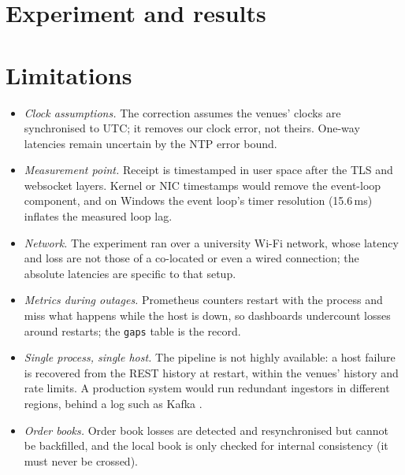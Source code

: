 \documentclass[11pt,a4paper]{article}
\newcommand{\code}[1]{\texttt{#1}}
\newcommand{\ms}{\,ms}
\begin{document}
\section{Experiment and results}\label{sec:results}



\section{Limitations}\label{sec:limitations}

\begin{itemize}[nosep]
  \item \emph{Clock assumptions.} The correction assumes the venues' clocks are synchronised to UTC; it removes
        our clock error, not theirs. One-way latencies remain uncertain by the NTP error bound.
  \item \emph{Measurement point.} Receipt is timestamped in user space after the TLS and websocket layers.
        Kernel or NIC timestamps would remove the event-loop component, and on Windows the event loop's timer
        resolution (15.6\ms) inflates the measured loop lag.
  \item \emph{Network.} The experiment ran over a university Wi-Fi network, whose latency and loss are not
        those of a co-located or even a wired connection; the absolute latencies are specific to that setup.
  \item \emph{Metrics during outages.} Prometheus counters restart with the process and miss what happens while
        the host is down, so dashboards undercount losses around restarts; the \code{gaps} table is the record.
  \item \emph{Single process, single host.} The pipeline is not highly available: a host failure is recovered
        from the REST history at restart, within the venues' history and rate limits. A production system would
        run redundant ingestors in different regions, behind a log such as Kafka \citep{kreps2011,kleppmann2017}.
  \item \emph{Order books.} Order book losses are detected and resynchronised but cannot be backfilled, and the
        local book is only checked for internal consistency (it must never be crossed).
\end{itemize}
\end{document}
